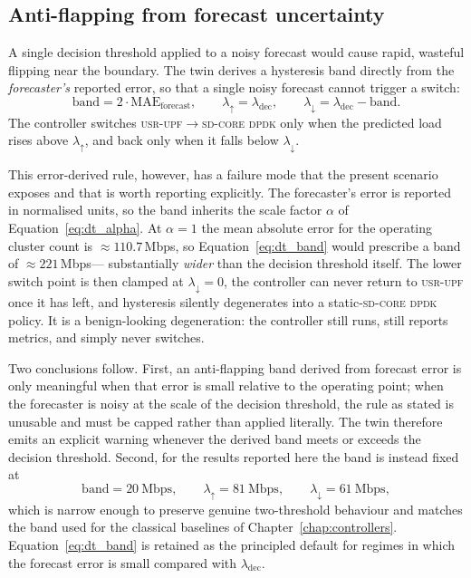 \documentclass[12pt, a4paper]{report}
\newcommand{\dpdk}{\textsc{sd-core dpdk}}
\newcommand{\usr}{\textsc{usr-upf}}
\begin{document}
\subsection{Anti-flapping from forecast uncertainty}

A single decision threshold applied to a noisy forecast would cause rapid,
wasteful flipping near the boundary. The twin derives a hysteresis band
directly from the \emph{forecaster's} reported error, so that a single noisy
forecast cannot trigger a switch:
\begin{equation}
  \text{band} = 2 \cdot \mathrm{MAE}_{\mathrm{forecast}},\qquad
  \lambda_{\uparrow} = \lambda_{\mathrm{dec}},\qquad
  \lambda_{\downarrow} = \lambda_{\mathrm{dec}} - \text{band}.
  \label{eq:dt_band}
\end{equation}
The controller switches \usr{}$\to$\dpdk{} only when the predicted load rises
above $\lambda_{\uparrow}$, and back only when it falls below
$\lambda_{\downarrow}$.

This error-derived rule, however, has a failure mode that the present scenario
exposes and that is worth reporting explicitly. The forecaster's error is
reported in normalised units, so the band inherits the scale factor $\alpha$
of Equation~\eqref{eq:dt_alpha}. At $\alpha = 1$ the mean absolute error for
the operating cluster count is $\approx 110.7$\,Mbps, so
Equation~\eqref{eq:dt_band} would prescribe a band of $\approx 221$\,Mbps---
substantially \emph{wider} than the decision threshold itself. The lower
switch point is then clamped at $\lambda_{\downarrow} = 0$, the controller can
never return to \usr{} once it has left, and hysteresis silently degenerates
into a static-\dpdk{} policy. It is a benign-looking degeneration: the
controller still runs, still reports metrics, and simply never switches.

Two conclusions follow. First, an anti-flapping band derived from forecast
error is only meaningful when that error is small relative to the operating
point; when the forecaster is noisy at the scale of the decision threshold,
the rule as stated is unusable and must be capped rather than applied
literally. The twin therefore emits an explicit warning whenever the derived
band meets or exceeds the decision threshold. Second, for the results reported
here the band is instead fixed at
\begin{equation}
  \text{band} = 20~\text{Mbps},\qquad
  \lambda_{\uparrow} = 81~\text{Mbps},\qquad
  \lambda_{\downarrow} = 61~\text{Mbps},
  \label{eq:dt_band_used}
\end{equation}
which is narrow enough to preserve genuine two-threshold behaviour and matches
the band used for the classical baselines of
Chapter~\ref{chap:controllers}. Equation~\eqref{eq:dt_band} is retained as the
principled default for regimes in which the forecast error is small compared
with $\lambda_{\mathrm{dec}}$.
\end{document}
